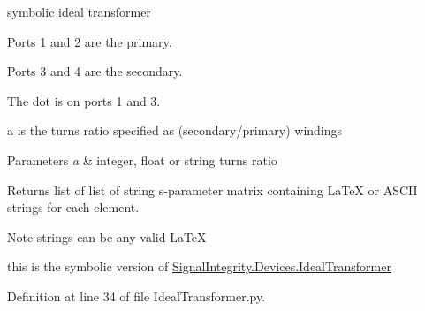 symbolic ideal transformer 

Ports 1 and 2 are the primary.

Ports 3 and 4 are the secondary.

The dot is on ports 1 and 3.

a is the turns ratio specified as (secondary/primary) windings


\begin{DoxyParams}{Parameters}
{\em a} & integer, float or string turns ratio~\newline
 \\
\hline
\end{DoxyParams}
\begin{DoxyReturn}{Returns}
list of list of string s-\/parameter matrix containing La\+TeX or A\+S\+C\+II strings for each element. 
\end{DoxyReturn}
\begin{DoxyNote}{Note}
strings can be any valid La\+TeX 

this is the symbolic version of \hyperlink{namespaceSignalIntegrity_1_1Devices_1_1IdealTransformer}{Signal\+Integrity.\+Devices.\+Ideal\+Transformer} 
\end{DoxyNote}


Definition at line 34 of file Ideal\+Transformer.\+py.

